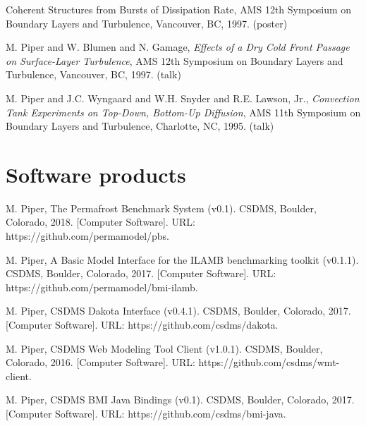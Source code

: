 \documentclass[letterpaper]{resume}
\begin{document}
\begin{enumerate}[{[}1{]}]
{    Coherent Structures from Bursts of Dissipation Rate}, {AMS 12th
    Symposium on Boundary Layers and Turbulence}, {Vancouver, BC},
    1997. (poster)
  \item {M. Piper and W. Blumen and N. Gamage}, \textit{Effects of a
    Dry Cold Front Passage on Surface-Layer Turbulence}, {AMS 12th
    Symposium on Boundary Layers and Turbulence}, {Vancouver, BC},
    1997. (talk)
  \item {M. Piper and J.C. Wyngaard and W.H. Snyder and R.E. Lawson,
    Jr.}, \textit{Convection Tank Experiments on Top-Down, Bottom-Up
    Diffusion}, {AMS 11th Symposium on Boundary Layers and
    Turbulence}, {Charlotte, NC}, 1995. (talk)
\end{enumerate}


\section{Software products}

\vspace{1.0em}
\begin{enumerate}[{[}1{]}]

  \item M. Piper, The Permafrost Benchmark System (v0.1). CSDMS,
    Boulder, Colorado, 2018. [Computer Software]. URL:
    https://github.com/permamodel/pbs.

  \item M. Piper, A Basic Model Interface for the ILAMB benchmarking
    toolkit (v0.1.1). CSDMS, Boulder, Colorado, 2017. [Computer
      Software]. URL: https://github.com/permamodel/bmi-ilamb.

  \item M. Piper, CSDMS Dakota Interface (v0.4.1). CSDMS, Boulder,
    Colorado, 2017. [Computer Software]. URL:
    https://github.com/csdms/dakota.

  \item M. Piper, CSDMS Web Modeling Tool Client (v1.0.1). CSDMS,
    Boulder, Colorado, 2016. [Computer Software]. URL:
    https://github.com/csdms/wmt-client.

 \item M. Piper, CSDMS BMI Java Bindings (v0.1). CSDMS, Boulder,
   Colorado, 2017. [Computer Software]. URL:
   https://github.com/csdms/bmi-java.

\end{enumerate}
\end{document}
